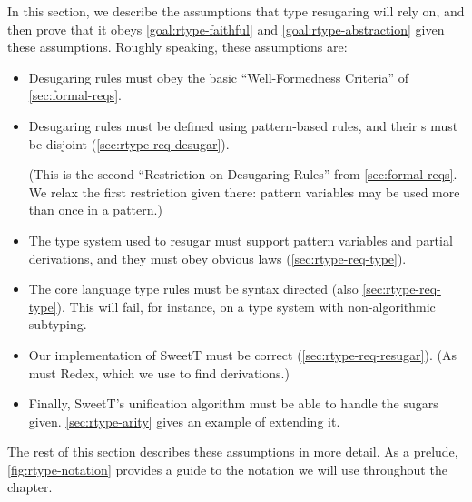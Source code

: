 In this section, we describe the assumptions that type resugaring will
rely on, and then prove that it obeys
\cref{goal:rtype-faithful} and \cref{goal:rtype-abstraction} given these assumptions.
Roughly speaking, these assumptions are:
\begin{itemize}
  \item Desugaring rules must obey the basic ``Well-Formedness
    Criteria'' of \cref{sec:formal-reqs}.
  \item Desugaring rules must be defined using pattern-based rules,
    and their s must be disjoint (\cref{sec:rtype-req-desugar}).

    (This is the second ``Restriction on Desugaring Rules'' from
    \cref{sec:formal-reqs}. We relax the first restriction given
    there: pattern variables may be used more than once in a pattern.)
  \item The type system used
    to resugar must support pattern variables and partial
    derivations, and they must obey obvious laws (\cref{sec:rtype-req-type}).
  \item The core language type rules must be syntax directed
    (also \cref{sec:rtype-req-type}). This will fail, for instance, on a
    type system with non-algorithmic subtyping.
  \item Our implementation of SweetT must be correct
    (\cref{sec:rtype-req-resugar}). (As must Redex, which we use to find
    derivations.)
  \item Finally, SweetT's unification algorithm must be able to handle
    the sugars given. \cref{sec:rtype-arity} gives an example of extending it.
\end{itemize}

The rest of this section describes these assumptions in more
detail. As a prelude, \cref{fig:rtype-notation} provides a guide to the
notation we will use throughout the chapter.

